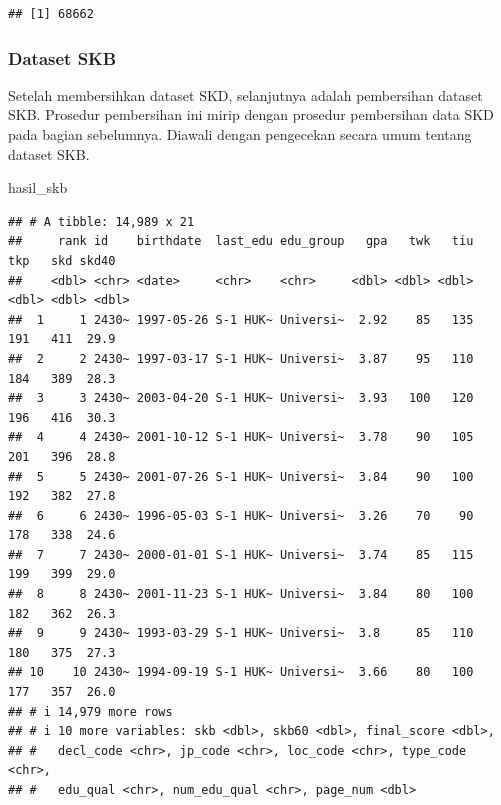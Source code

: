 \documentclass[
]{article}
\newenvironment{Shaded}{\begin{snugshade}}{\end{snugshade}}
\newcommand{\FunctionTok}[1]{\textcolor[rgb]{0.13,0.29,0.53}{\textbf{#1}}}
\newcommand{\NormalTok}[1]{#1}
\newcommand{\SpecialCharTok}[1]{\textcolor[rgb]{0.81,0.36,0.00}{\textbf{#1}}}
\begin{document}
\begin{verbatim}
## [1] 68662
\end{verbatim}

\subsubsection{Dataset SKB}\label{dataset-skb}

Setelah membersihkan dataset SKD, selanjutnya adalah pembersihan dataset
SKB. Prosedur pembersihan ini mirip dengan prosedur pembersihan data SKD
pada bagian sebelumnya. Diawali dengan pengecekan secara umum tentang
dataset SKB.

\begin{Shaded}
\begin{Highlighting}[]
\NormalTok{hasil\_skb}
\end{Highlighting}
\end{Shaded}

\begin{verbatim}
## # A tibble: 14,989 x 21
##     rank id    birthdate  last_edu edu_group   gpa   twk   tiu   tkp   skd skd40
##    <dbl> <chr> <date>     <chr>    <chr>     <dbl> <dbl> <dbl> <dbl> <dbl> <dbl>
##  1     1 2430~ 1997-05-26 S-1 HUK~ Universi~  2.92    85   135   191   411  29.9
##  2     2 2430~ 1997-03-17 S-1 HUK~ Universi~  3.87    95   110   184   389  28.3
##  3     3 2430~ 2003-04-20 S-1 HUK~ Universi~  3.93   100   120   196   416  30.3
##  4     4 2430~ 2001-10-12 S-1 HUK~ Universi~  3.78    90   105   201   396  28.8
##  5     5 2430~ 2001-07-26 S-1 HUK~ Universi~  3.84    90   100   192   382  27.8
##  6     6 2430~ 1996-05-03 S-1 HUK~ Universi~  3.26    70    90   178   338  24.6
##  7     7 2430~ 2000-01-01 S-1 HUK~ Universi~  3.74    85   115   199   399  29.0
##  8     8 2430~ 2001-11-23 S-1 HUK~ Universi~  3.84    80   100   182   362  26.3
##  9     9 2430~ 1993-03-29 S-1 HUK~ Universi~  3.8     85   110   180   375  27.3
## 10    10 2430~ 1994-09-19 S-1 HUK~ Universi~  3.66    80   100   177   357  26.0
## # i 14,979 more rows
## # i 10 more variables: skb <dbl>, skb60 <dbl>, final_score <dbl>,
## #   decl_code <chr>, jp_code <chr>, loc_code <chr>, type_code <chr>,
## #   edu_qual <chr>, num_edu_qual <chr>, page_num <dbl>
\end{verbatim}

\begin{Shaded}
\end{Shaded}
\end{document}
